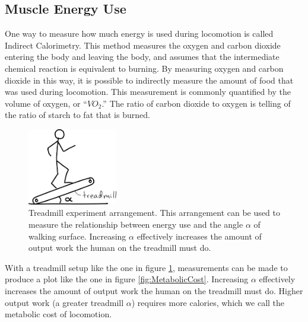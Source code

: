 \subsection{Muscle Energy Use}

One way to measure how much energy is used during locomotion is called Indirect Calorimetry. This method measures the oxygen and carbon dioxide entering the body and leaving the body, and assumes that the intermediate chemical reaction is equivalent to burning. By measuring oxygen and carbon dioxide in this way, it is possible to indirectly measure the amount of food that was used during locomotion. This measurement is commonly quantified by the volume of oxygen, or ``$VO_2$.'' The ratio of carbon dioxide to oxygen is telling of the ratio of starch to fat that is burned.

\begin{figure}[htb]		%
\begin{centering}
\includegraphics[width=0.35\textwidth]{Figures/Treadmill}\par
\end{centering}
\caption[Diagram: Treadmill Experiment Arrangement]{Treadmill experiment arrangement. This arrangement can be used to measure the relationship between energy use and the angle $\alpha$ of walking surface. Increasing $\alpha$ effectively increases the amount of output work the human on the treadmill must do.}
\label{fig:Treadmill}
\end{figure}
%

With a treadmill setup like the one in figure \ref{fig:Treadmill}, measurements can be made to produce a plot like the one in figure \ref{fig:MetabolicCost}. Increasing $\alpha$ effectively increases the amount of output work the human on the treadmill must do. Higher output work (a greater treadmill $\alpha$) requires more calories, which we call the metabolic cost of locomotion. 


